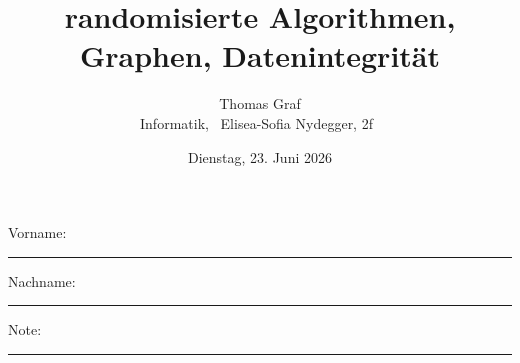 \newtoggle{withbonus}  %

\newcommand{\mycourse}{Informatik}
\newcommand{\myclass}{\faPeace\faIceCream~Elisea-Sofia Nydegger, 2f~\faIceCream\faPeace}
\newcommand{\mydate}{Dienstag, 23. Juni 2026}

\title{\textbf{randomisierte Algorithmen, Graphen, Datenintegrität}}
\author{Thomas Graf\\
\mycourse, \myclass}
\date{\mydate}
\maketitle
\thispagestyle{headandfoot}		

\begin{center}
\end{center}
\vspace{10mm}

\begin{center}
	Vorname: \rule{45mm}{0.8pt}\qquad Nachname: \rule{45mm}{0.8pt}
\end{center}
\vspace{20mm}

\begin{center}
	\iftoggle{withbonus} {
		\combinedgradetable[h][questions]
	} {
		\gradetable[h][questions]
	}
\end{center}
\vspace{15mm}
\begin{center}
	Note: 
	\vspace{10mm}
	
	\rule{8mm}{1.2pt}
\end{center}

\clearpage

